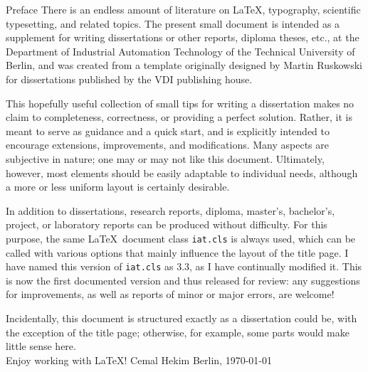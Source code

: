 \begin{vorwort}{Preface}
There is an endless amount of literature on \LaTeX, typography, scientific typesetting, and related topics. The present small document is intended as a supplement for writing dissertations or other reports, diploma theses, etc., at the Department of Industrial Automation Technology of the Technical University of Berlin, and was created from a template originally designed by Martin Ruskowski for dissertations published by the VDI publishing house.  

This hopefully useful collection of small tips for writing a dissertation makes no claim to completeness, correctness, or providing a perfect solution. Rather, it is meant to serve as guidance and a quick start, and is explicitly intended to encourage extensions, improvements, and modifications. Many aspects are subjective in nature; one may or may not like this document. Ultimately, however, most elements should be easily adaptable to individual needs, although a more or less uniform layout is certainly desirable.  

In addition to dissertations, research reports, diploma, master’s, bachelor’s, project, or laboratory reports can be produced without difficulty. For this purpose, the same \LaTeX\ document class {\tt iat.cls} is always used, which can be called with various options that mainly influence the layout of the title page. I have named this version of {\tt iat.cls} as 3.3, as I have continually modified it. This is now the first documented version and thus released for review: any suggestions for improvements, as well as reports of minor or major errors, are welcome!  

Incidentally, this document is structured exactly as a dissertation could be, with the exception of the title page; otherwise, for example, some parts would make little sense here.  
\\Enjoy working with {\LaTeX}!
\vfill
Cemal Hekim \hfill Berlin, \today

\end{vorwort}
